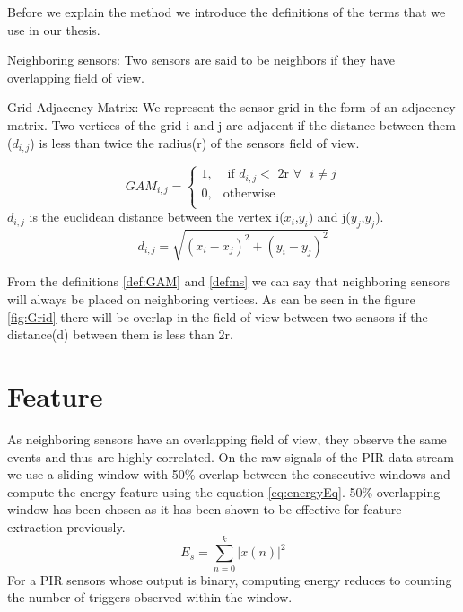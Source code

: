 Before we explain the method we introduce the definitions of the terms that we use in our thesis.\\
\begin{definition}{Neighboring sensors:}
 Two sensors are said to be neighbors if they have overlapping field of view.
\label{def:ns}
\end{definition}
\begin{definition}{Grid Adjacency Matrix:}
 We represent the sensor grid in the form of an adjacency matrix. Two vertices of the grid i and j are adjacent if the distance between them ($d_{i,j}$) is less than twice the radius(r) of the sensors field of view.

\[
GAM_{i,j} = 
\begin{cases}
1, &\text{ if } d_{i,j} < \text{  2r } \forall \text{ } i \ne j\\
0, & \text{otherwise}\\
\end{cases}
    \]
$d_{i,j}$  is the euclidean distance between the vertex i($x_i$,$y_i$) and j($y_j$,$y_j$).
\begin{equation*}
d_{i,j}=\sqrt{(x_i-x_j)^2 + (y_i-y_j)^2}
\end{equation*}
\label{def:GAM}
\end{definition}
From the definitions \ref{def:GAM} and \ref{def:ns} we can say that neighboring sensors will always be placed on neighboring vertices. As can be seen in the figure \ref{fig:Grid} there will be overlap in the field of view between two sensors if the distance(d) between them is less than 2r.

\section{Feature}
As neighboring sensors have an overlapping field of view, they observe the same events and thus are highly correlated.
On the raw signals of the PIR data stream we use a sliding window with 50\% overlap between the consecutive windows and compute the energy feature using the equation \ref{eq:energyEq}. 50\% overlapping window has been chosen as it has been shown to be effective for feature extraction previously\cite{bao2004activity}.
\begin{equation}
\label{eq:energyEq}
E_s = {\sum_{n=0}^{k}{|x(n)|}^2}
\end{equation}
For a PIR sensors whose output is binary, computing energy reduces to counting the number of triggers observed within the window.

